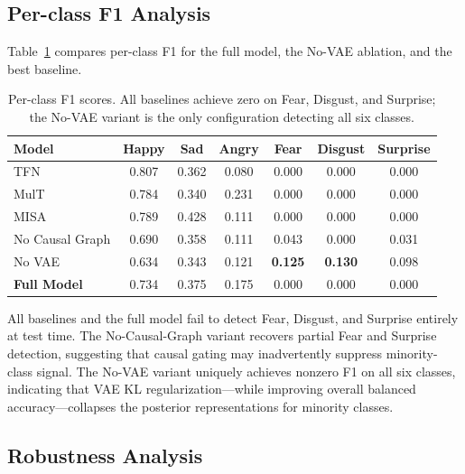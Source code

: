 \documentclass[conference]{IEEEtran}
\begin{document}
\subsection{Per-class F1 Analysis}

Table~\ref{tab:perclass} compares per-class F1 for the full model, the
No-VAE ablation, and the best baseline.

\begin{table}[htbp]
\caption{Per-class F1 scores.  All baselines achieve zero on Fear, Disgust, and
Surprise; the No-VAE variant is the only configuration detecting all six classes.}
\label{tab:perclass}
\begin{center}
\setlength{\tabcolsep}{3pt}
\begin{tabular}{@{}lcccccc@{}}
\toprule
\textbf{Model} & \textbf{Happy} & \textbf{Sad} & \textbf{Angry}
    & \textbf{Fear} & \textbf{Disgust} & \textbf{Surprise} \\
\midrule
TFN              & 0.807 & 0.362 & 0.080 & 0.000 & 0.000 & 0.000 \\
MulT             & 0.784 & 0.340 & 0.231 & 0.000 & 0.000 & 0.000 \\
MISA             & 0.789 & 0.428 & 0.111 & 0.000 & 0.000 & 0.000 \\
\midrule
No Causal Graph  & 0.690 & 0.358 & 0.111 & 0.043 & 0.000 & 0.031 \\
No VAE           & 0.634 & 0.343 & 0.121 & \textbf{0.125} & \textbf{0.130} & 0.098 \\
\textbf{Full Model} & 0.734 & 0.375 & 0.175 & 0.000 & 0.000 & 0.000 \\
\bottomrule
\end{tabular}
\end{center}
\end{table}

All baselines and the full model fail to detect Fear, Disgust, and Surprise
entirely at test time.  The No-Causal-Graph variant recovers partial Fear and
Surprise detection, suggesting that causal gating may inadvertently suppress
minority-class signal.  The No-VAE variant uniquely achieves nonzero F1 on
all six classes, indicating that VAE KL regularization---while improving
overall balanced accuracy---collapses the posterior representations for
minority classes.

\subsection{Robustness Analysis}
\end{document}
